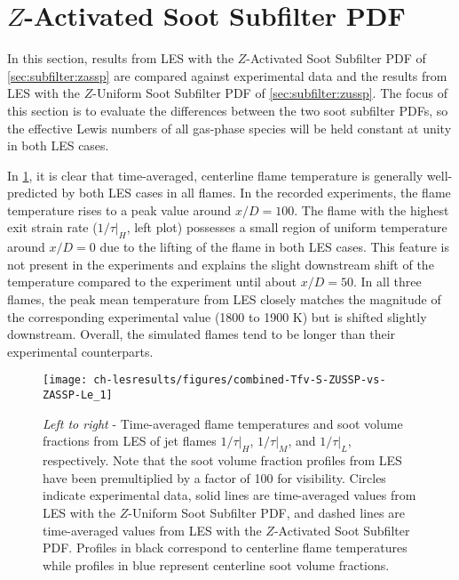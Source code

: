 \section{$Z$-Activated Soot Subfilter PDF}
\label{sec:lesresults:zassp}

In this section, results from LES with the $Z$-Activated Soot Subfilter PDF of \cref{sec:subfilter:zassp} are compared against experimental data and the results from LES with the $Z$-Uniform Soot Subfilter PDF of \cref{sec:subfilter:zussp}. The focus of this section is to evaluate the differences between the two soot subfilter PDFs, so the effective Lewis numbers of all gas-phase species will be held constant at unity in both LES cases.

In \cref{fig:lesresults:zassp:ctrlineleseval}, it is clear that time-averaged, centerline flame temperature is generally well-predicted by both LES cases in all flames. In the recorded experiments, the flame temperature rises to a peak value around $x/D = 100$. The flame with the highest exit strain rate ($1/\tau|_H$, left plot) possesses a small region of uniform temperature around $x/D = 0$ due to the lifting of the flame in both LES cases. This feature is not present in the experiments and explains the slight downstream shift of the temperature compared to the experiment until about $x/D = 50$. In all three flames, the peak mean temperature from LES closely matches the magnitude of the corresponding experimental value (1800 to 1900 K) but is shifted slightly downstream. Overall, the simulated flames tend to be longer than their experimental counterparts.

\begin{figure}[htb]
  \centering
  \texttt{[image: ch-lesresults/figures/combined-Tfv-S-ZUSSP-vs-ZASSP-Le\_1]}
  \caption[Centerline $\langle T \rangle$ \& $\langle f_V \rangle$ from LES with $Z$-Activated Soot Subfilter PDF]{\textit{Left to right} - Time-averaged flame temperatures and soot volume fractions from LES of jet flames $1/\tau|_H$, $1/\tau|_M$, and $1/\tau|_L$, respectively. Note that the soot volume fraction profiles from LES have been premultiplied by a factor of 100 for visibility. Circles indicate experimental data, solid lines are time-averaged values from LES with the $Z$-Uniform Soot Subfilter PDF, and dashed lines are time-averaged values from LES with the $Z$-Activated Soot Subfilter PDF. Profiles in black correspond to centerline flame temperatures while profiles in blue represent centerline soot volume fractions.}
  \label{fig:lesresults:zassp:ctrlineleseval}
\end{figure}

